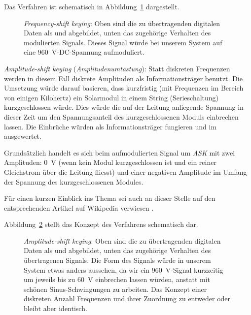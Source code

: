 Das    Verfahren    ist   schematisch    in    Abbildung~\ref{fig:fsk:concept}
dargestellt.

\begin{figure}[h!tb]
    \centering
    
    \caption{%
        \emph{Frequency-shift  keying}: Oben   sind  die   zu  \"ubertragenden
        digitalen  Daten  als    und   abgebildet,  unten  das
        zugeh\"orige Verhalten des  modulierten Signals. Dieses Signal w\"urde
        bei unserem System auf eine \SI{960}{\volt}-DC-Spannung aufmoduliert.%
    }
    \label{fig:fsk:concept}
\end{figure}

\myfancybreak

\emph{Amplitude-shift  keying}  (\emph{Amplitudenumtastung}): Statt  diskreten
Frequenzen werden in diesem  Fall diskrete Amplituden als Informationstr\"ager
benutzt. Die   Umsetzung    w\"urde   darauf   basieren,    dass   kurzfristig
(mit   Frequenzen   im  Bereich   von   einigen   Kilohertz)  ein   Solarmodul
 in einem  String (Serieschaltung) kurzgeschlossen
w\"urde. Dies w\"urde die  auf der Leitung anliegende Spannung  in dieser Zeit
um  den Spannungsanteil  des kurzgeschlossenen  Moduls einbrechen  lassen. Die
Einbr\"uche  w\"urden  als  Informationstr\"ager   fungieren  und  im  \Master
ausgewertet.

Grunds\"atzlich handelt es  sich beim aufmodulierten Signal  um \emph{ASK} mit
zwei Amplituden: \SI{0}{\volt}  (wenn kein  Modul kurzgeschlossen ist  und ein
reiner Gleichstrom \"uber  die Leitung fliesst) und  einer negativen Amplitude
im Umfang der Spannung des kurzgeschlossenen Modules.

F\"ur  einen kurzen  Einblick ins  Thema  sei auch  an dieser  Stelle auf  den
entsprechenden Artikel auf Wikipedia verwiesen \cite{ref:ask:wikipedia}.

Abbildung~\ref{fig:ask:concept} stellt das  Konzept des Verfahrens schematisch
dar. 

\begin{figure}[h!tb]
    \centering
    
    \caption{%
        \emph{Amplitude-shift  keying}: Oben   sind  die   zu  \"ubertragenden
        digitalen  Daten  als    und   abgebildet,  unten  das
        zugeh\"orige  Verhalten  des   \"ubertragenen  Signals. Die  Form  des
        Signals w\"urde  in unserem System  etwas anders aussehen, da  wir ein
        \SI{960}{\volt}-Signal  kurzzeitig um  jeweils  bis zu  \SI{60}{\volt}
        einbrechen lassen  w\"urden, anstatt mit  sch\"onen Sinus-Schwingungen
        zu arbeiten. Das  Konzept einer diskreten Anzahl  Frequenzen und ihrer
        Zuordnung zu entweder  oder  bleibt aber identisch.%
    }
    \label{fig:ask:concept}
\end{figure}

